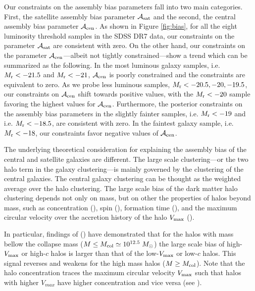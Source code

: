 Our constraints on the assembly bias parameters fall into two main categories. First, the satellite 
assembly bias parameter $\mathcal{A}_{\rm sat}$ and the second, the central assembly bias parameter $\mathcal{A}_{\rm cen}$. As shown in Figure \ref{fig:bias}, for all the eight luminosity threshold samples in the SDSS DR7 data, our constraints on the parameter $\mathcal{A}_{\rm sat}$ are 
consistent with zero. On the other hand, our constraints on the parameter $\mathcal{A}_{\rm cen}$---albeit not tightly constrained---show a trend which can be summarized as the following. In the most luminous galaxy samples, i.e. $M_{\rm r} < -21.5$ and $M_{\rm r} < -21$, $\mathcal{A}_{\rm cen}$ is poorly constrained and the constraints are equivalent to zero. As we probe less luminous samples, $M_{\rm r} < -20.5 , -20, -19.5$, our constraints on $\mathcal{A}_{\rm cen}$ shift towards positive values, with the $M_{\rm r}<-20$ sample favoring the highest values for $\mathcal{A}_{\rm cen}$. Furthermore, the posterior constraints on the assembly bias parameters in the slightly fainter samples, i.e. $M_{\rm r} < -19$ and i.e. $M_{\rm r} < -18.5$, are consistent with zero. In the faintest galaxy sample, i.e. $M_{\rm r} < -18$, our constraints favor negative values of $\mathcal{A}_{\rm cen}$.

The underlying theoretical consideration for explaining the assembly bias of the central 
and satellite galaxies are different. The large scale clustering---or the two halo term in the galaxy clustering---is mainly governed by the clustering of the central galaxies. The central galaxy clustering can be thought as the weighted average over the halo clustering. The large scale bias of the dark matter halo clustering depends not only on mass, but on other the properties of halos beyond mass, such as concentration (\citealt{weschler2006,gao2007,miyatake2016}), spin (\citealt{gao2007}), formation time (\citealt{gao2007, li2008}), and the maximum circular velocity over the accretion history of the halo $V_{\rm max}$ (\citealt{sunayama2016}).

In particular, findings of (\citealt{weschler2006,sunayama2016})
have demonstrated that for the halos with mass bellow the collapse mass ($M \leq M_{\rm col} \simeq 10^{12.5}\; M_{\odot} $) the large scale bias of high-$V_{\rm max}$ or high-$c$ halos is larger than that of the low-$V_{\rm max}$ or low-$c$ halos. This signal reverses and weakens for the high mass halos ($M \geq M_{\rm col}$). Note that the halo concentration traces the maximum circular velocity $V_{\rm max}$ such that halos with higher $V_{max}$ have higher concentration and vice versa (see \citealt{prada2012}). 


